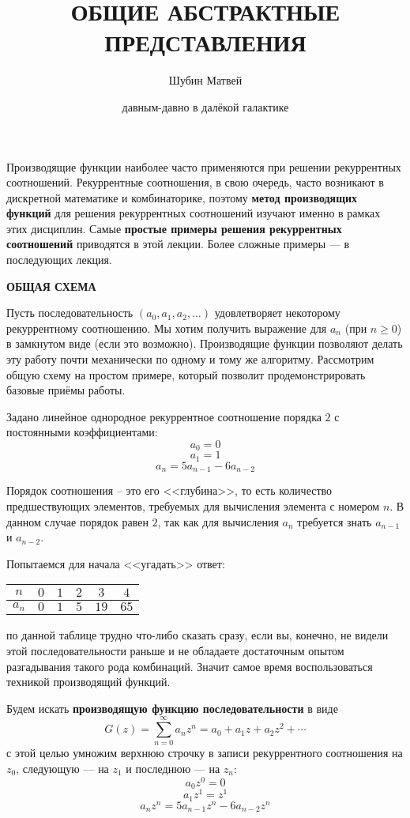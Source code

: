 \documentclass[12pt, letterpaper]{extarticle}
\title{\textbf{ОБЩИЕ АБСТРАКТНЫЕ ПРЕДСТАВЛЕНИЯ}}
\author{Шубин Матвей}
\date{давным-давно в далёкой галактике}
\begin{document}
\maketitle
Производящие функции наиболее часто применяются при решении рекуррентных соотношений. Рекуррентные соотношения, в свою очередь, часто возникают в дискретной математике и комбинаторике, поэтому \textbf{метод производящих функций} для решения рекуррентных соотношений изучают именно в рамках этих дисциплин. Самые \textbf{простые примеры решения рекуррентных соотношений} приводятся в этой лекции. Более сложные примеры — в последующих лекция.
\begin{center}
  \textbf{ОБЩАЯ СХЕМА}
\end{center}

Пусть последовательность $(a_0, a_1, a_2, \dots)$ удовлетворяет некоторому рекуррентному соотношению. Мы хотим получить выражение для $a_n$ (при $n\geq0$) в замкнутом виде (если это возможно). Производящие функции позволяют делать эту работу почти механически по одному и тому же алгоритму. Рассмотрим общую схему на простом примере, который позволит продемонстрировать базовые приёмы работы.

Задано линейное однородное рекуррентное соотношение порядка $2$ с постоянными коэффициентами:
\[a_0=0\]
\[a_1=1\]
\[a_n=5a_{n-1}-6a_{n-2}\]

Порядок соотношения -- это его <<глубина>>, то есть количество предшествующих элементов, требуемых для вычисления элемента с номером $n$. В данном случае порядок равен $2$, так как для вычисления $a_n$ требуется знать $a_{n-1}$ и $a_{n-2}$.

Попытаемся для начала <<угадать>> ответ:

\begin{center}
  \begin{tabular}{| c | c | c | c | c | c |}
    \hline
    $n$ & $0$ & $1$ & $2$ & $3$ & $4$ \\
    \hline
    $a_n$ & $0$ & $1$ & $5$ & $19$ & $65$\\
    \hline
  \end{tabular}
\end{center}

по данной таблице трудно что-либо сказать сразу, если вы, конечно, не видели этой последовательности раньше и не обладаете достаточным опытом разгадывания такого рода комбинаций. Значит самое время воспользоваться техникой производящий функций.

Будем искать \textbf{производящую функцию последовательности} в виде
\[G(z)=\sum_{n=0}^{\infty}a_nz^n=a_0+a_1z+a_2z^2+\cdots\]
с этой целью умножим верхнюю строчку в записи рекуррентного соотношения на $z_0$, следующую — на $z_1$ и последнюю — на $z_n$:
\[a_0z^0=0\]
\[a_1z^1=z^1\]
\[a_nz^n=5a_{n-1}z^n-6a_{n-2}z^n\]
\end{document}
